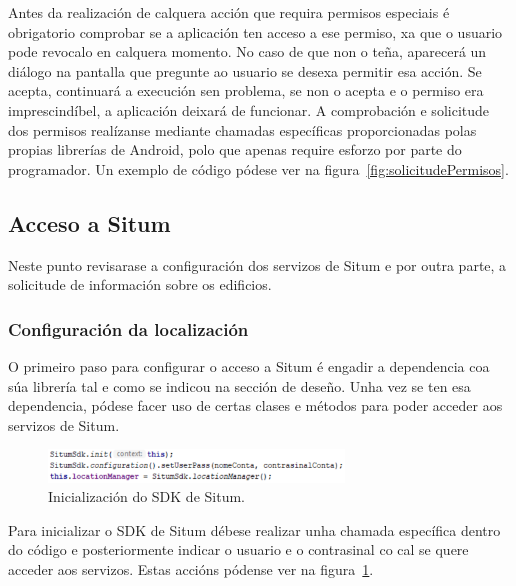 Antes da realización de calquera acción que requira permisos especiais é obrigatorio comprobar se a aplicación ten acceso a ese permiso, xa que o usuario pode revocalo en calquera momento. No caso de que non o teña, aparecerá un diálogo na pantalla que pregunte ao usuario se desexa permitir esa acción. Se acepta, continuará a execución sen problema, se non o acepta e o permiso era imprescindíbel, a aplicación deixará de funcionar. A comprobación e solicitude dos permisos realízanse mediante chamadas específicas proporcionadas polas propias librerías de Android, polo que apenas require esforzo por parte do programador. Un exemplo de código pódese ver na figura~\ref{fig:solicitudePermisos}.


\subsection{Acceso a Situm}
Neste punto revisarase a configuración dos servizos de Situm e por outra parte, a solicitude de información sobre os edificios.

\subsubsection{Configuración da localización}
O primeiro paso para configurar o acceso a Situm é engadir a dependencia coa súa librería tal e como se indicou na sección de deseño. Unha vez se ten esa dependencia, pódese facer uso de certas clases e métodos para poder acceder aos servizos de Situm.

\begin{figure}[htb] 
	\begin{center}
		\includegraphics[width=0.7\textwidth]{figures/codigo/situmInicio}
		\caption{Inicialización do SDK de Situm.}
		\label{fig:situmInicio}
	\end{center}
\end{figure}

Para inicializar o SDK de Situm débese realizar unha chamada específica dentro do código e posteriormente indicar o usuario e o contrasinal co cal se quere acceder aos servizos. Estas accións pódense ver na figura~\ref{fig:situmInicio}.

